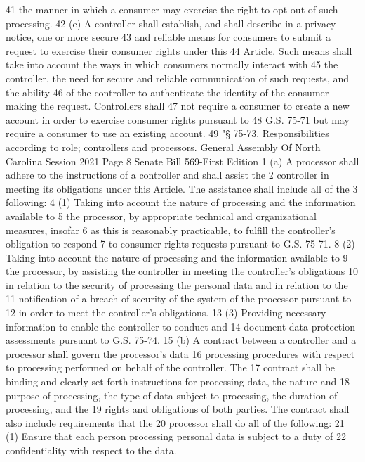 41 the manner in which a consumer may exercise the right to opt out of such processing.
42 (e) A controller shall establish, and shall describe in a privacy notice, one or more secure
43 and reliable means for consumers to submit a request to exercise their consumer rights under this
44 Article. Such means shall take into account the ways in which consumers normally interact with
45 the controller, the need for secure and reliable communication of such requests, and the ability
46 of the controller to authenticate the identity of the consumer making the request. Controllers shall
47 not require a consumer to create a new account in order to exercise consumer rights pursuant to
48 G.S. 75-71 but may require a consumer to use an existing account.
49 "§ 75-73. Responsibilities according to role; controllers and processors.
General Assembly Of North Carolina Session 2021
Page 8 Senate Bill 569-First Edition
1 (a) A processor shall adhere to the instructions of a controller and shall assist the
2 controller in meeting its obligations under this Article. The assistance shall include all of the
3 following:
4 (1) Taking into account the nature of processing and the information available to
5 the processor, by appropriate technical and organizational measures, insofar
6 as this is reasonably practicable, to fulfill the controller's obligation to respond
7 to consumer rights requests pursuant to G.S. 75-71.
8 (2) Taking into account the nature of processing and the information available to
9 the processor, by assisting the controller in meeting the controller's obligations
10 in relation to the security of processing the personal data and in relation to the
11 notification of a breach of security of the system of the processor pursuant to
12 in order to meet the controller's obligations.
13 (3) Providing necessary information to enable the controller to conduct and
14 document data protection assessments pursuant to G.S. 75-74.
15 (b) A contract between a controller and a processor shall govern the processor's data
16 processing procedures with respect to processing performed on behalf of the controller. The
17 contract shall be binding and clearly set forth instructions for processing data, the nature and
18 purpose of processing, the type of data subject to processing, the duration of processing, and the
19 rights and obligations of both parties. The contract shall also include requirements that the
20 processor shall do all of the following:
21 (1) Ensure that each person processing personal data is subject to a duty of
22 confidentiality with respect to the data.
